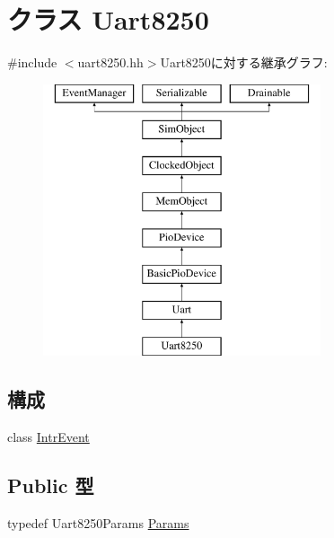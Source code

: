 \hypertarget{classUart8250}{
\section{クラス Uart8250}
\label{classUart8250}
}


{\ttfamily \#include $<$uart8250.hh$>$}Uart8250に対する継承グラフ:\begin{figure}[H]
\begin{center}
\leavevmode
\includegraphics[height=8cm]{classUart8250}
\end{center}
\end{figure}
\subsection*{構成}
\begin{DoxyCompactItemize}
\item 
class \hyperlink{classUart8250_1_1IntrEvent}{IntrEvent}
\end{DoxyCompactItemize}
\subsection*{Public 型}
\begin{DoxyCompactItemize}
\item 
typedef Uart8250Params \hyperlink{classUart8250_aa413e69885bd7a520ee8b988aa3e1c8b}{Params}
\end{DoxyCompactItemize}
